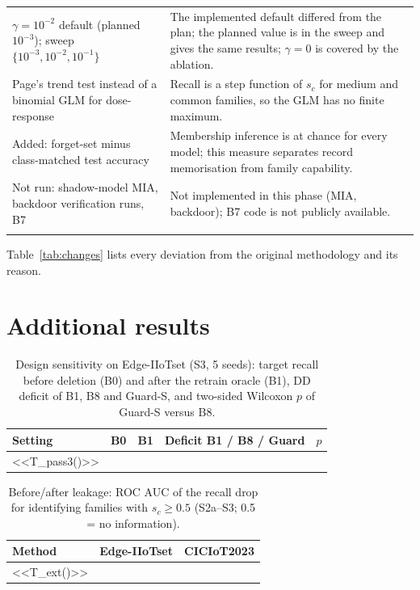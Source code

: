 \documentclass[pdflatex,sn-mathphys-num,iicol]{sn-jnl}
\begin{document}
\begin{appendices}
\begin{table}[!htbp]
\begin{tabular*}{\textwidth}{@{\extracolsep\fill}>{\raggedright\arraybackslash}p{4.6cm}>{\raggedright\arraybackslash}p{10.8cm}@{}}
$\gamma=10^{-2}$ default (planned $10^{-3}$); sweep $\{10^{-3},10^{-2},10^{-1}\}$ & The implemented default differed from the plan; the planned value is in the sweep and gives the same results; $\gamma=0$ is covered by the ablation. \\
Page's trend test instead of a binomial GLM for dose-response & Recall is a step function of $s_c$ for medium and common families, so the GLM has no finite maximum. \\
Added: forget-set minus class-matched test accuracy & Membership inference is at chance for every model; this measure separates record memorisation from family capability. \\
Not run: shadow-model MIA, backdoor verification runs, B7 & Not implemented in this phase (MIA, backdoor); B7 code is not publicly available. \\
\botrule
\end{tabular*}
\end{table}

Table~\ref{tab:changes} lists every deviation from the original methodology and its reason.

\FloatBarrier
\section{Additional results}\label{app:tables}

\begin{table}[!htbp]
\caption{Design sensitivity on Edge-IIoTset (S3, 5 seeds): target recall before deletion (B0) and after the retrain oracle (B1), DD deficit of B1, B8 and Guard-S, and two-sided Wilcoxon $p$ of Guard-S versus B8.}\label{tab:pass3}
\scriptsize
\setlength{\tabcolsep}{2pt}
\begin{tabular*}{\textwidth}{@{\extracolsep\fill}lcccccc}
\toprule
Setting & B0 & B1 & \multicolumn{3}{c}{Deficit B1 / B8 / Guard} & $p$ \\
\midrule
<<T_pass3()>>
\botrule
\end{tabular*}
\end{table}

\begin{table}[!htbp]
\caption{Before/after leakage: ROC AUC of the recall drop for identifying families with $s_c\ge0.5$ (S2a--S3; 0.5 = no information).}\label{tab:leak}
\footnotesize
\begin{tabular*}{\textwidth}{@{\extracolsep\fill}lcc}
\toprule
Method & Edge-IIoTset & CICIoT2023 \\
\midrule
<<T_ext()>>
\botrule
\end{tabular*}
\end{table}


\end{appendices}
\end{document}
